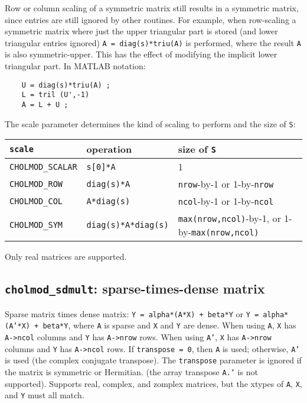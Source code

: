 \documentclass[11pt]{article}
\begin{document}
Row or column scaling of a symmetric matrix still results in a symmetric
matrix, since entries are still ignored by other routines.
For example, when row-scaling a symmetric matrix where just the upper
triangular part is stored (and lower triangular entries ignored)
{\tt A = diag(s)*triu(A)} is performed, where the result {\tt A} is also
symmetric-upper.  This has the effect of modifying the implicit lower
triangular part.  In MATLAB notation:
\begin{verbatim}
    U = diag(s)*triu(A) ;
    L = tril (U',-1)
    A = L + U ;
\end{verbatim}

The scale parameter determines the kind of scaling to perform and the size of {\tt S}:

\begin{tabular}{lll}
\hline
{\tt scale} & operation & size of {\tt S} \\
\hline
{\tt CHOLMOD\_SCALAR} & {\tt s[0]*A}		& 1 \\
{\tt CHOLMOD\_ROW}    & {\tt diag(s)*A}		& {\tt nrow}-by-1 or 1-by-{\tt nrow} \\
{\tt CHOLMOD\_COL}    & {\tt A*diag(s)}		& {\tt ncol}-by-1 or 1-by-{\tt ncol} \\
{\tt CHOLMOD\_SYM}    & {\tt diag(s)*A*diag(s)}	& {\tt max(nrow,ncol)}-by-1, or 1-by-{\tt max(nrow,ncol)} \\
\hline
\end{tabular}

Only real matrices are supported.

\newpage \subsection{{\tt cholmod\_sdmult}: sparse-times-dense matrix}


Sparse matrix times dense matrix:
{\tt Y = alpha*(A*X) + beta*Y} or {\tt Y = alpha*(A'*X) + beta*Y},
where {\tt A} is sparse and {\tt X} and {\tt Y} are dense.
When using {\tt A},  {\tt X} has {\tt A->ncol} columns and {\tt Y} has {\tt A->nrow} rows.
When using {\tt A'}, {\tt X} has {\tt A->nrow} columns and {\tt Y} has {\tt A->ncol} rows.
If {\tt transpose = 0}, then {\tt A} is used;
otherwise, {\tt A'} is used (the complex conjugate transpose).
The {\tt transpose} parameter is ignored if the matrix is symmetric or Hermitian.
(the array transpose {\tt A.'} is not supported).
Supports real, complex, and zomplex matrices, but the xtypes of {\tt A}, {\tt X}, and {\tt Y} must all match.
\end{document}
